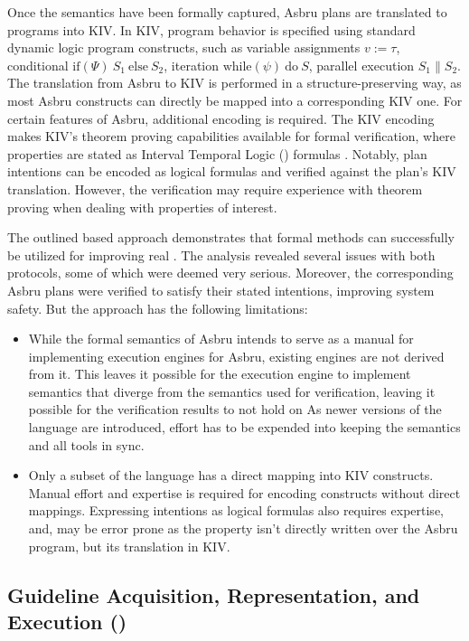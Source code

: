 Once the semantics have been formally captured, Asbru plans are
translated to programs into KIV. In KIV, program behavior is
specified using standard dynamic logic program constructs,
such as variable assignments $v := \tau$, conditional $\text{if}(\Psi)\ S_1
\ \text{else}\ S_2 $, iteration $\text{while}(\psi)\ \text{do}\ S$,
parallel execution $S_1 \parallel S_2$. The translation from Asbru
to KIV is performed in a structure-preserving way, as most
Asbru constructs can directly be mapped into a corresponding KIV one.
For certain features of Asbru, additional encoding is required.
The KIV encoding makes KIV's theorem proving capabilities available
for formal verification, where properties are stated as
Interval Temporal Logic (\ITL{}) formulas \cite{AllenJLC94}.
Notably, plan intentions can be encoded as logical formulas
and verified against the plan's KIV translation. However,
the verification may require experience with theorem proving
when dealing with properties of interest.

The outlined based approach demonstrates
that formal methods can successfully be utilized
for improving real \BPGs{}. The analysis revealed
several issues with both protocols, some of which were
deemed very serious. Moreover, the corresponding Asbru plans
were verified to satisfy their stated intentions, improving
system safety.
But the approach has the following limitations:
\begin{itemize}
  \item While the formal semantics of Asbru intends to serve
    as a manual for implementing execution engines for Asbru,
    existing engines are not derived from it. This leaves it possible
    for the execution engine to implement semantics that diverge
    from the \SOS{} semantics used for verification, leaving
    it possible for the verification results to not hold on
    As newer versions of the language are introduced, effort has
    to be expended into keeping the semantics and all tools in sync.
  \item Only a subset of the language has a direct mapping into
    KIV constructs. Manual effort and expertise is required
    for encoding constructs without direct mappings.
    Expressing intentions as logical formulas also requires
    expertise, and, may be error prone as the property isn't
    directly written over the Asbru program, but its translation in KIV.
\end{itemize}

\subsection{Guideline Acquisition, Representation, and Execution (\GLARE{})}\label{sec:glare}

